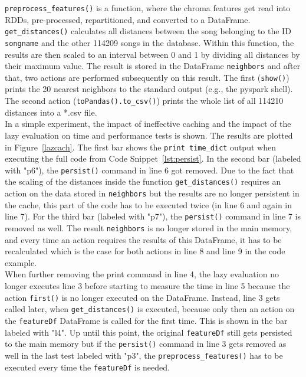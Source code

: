 \noindent \lstinline{preprocess_features()} is a function, where the chroma features get read into RDDs, pre-processed, repartitioned, and converted to a DataFrame. \lstinline{get_distances()} calculates all distances between the song belonging to the ID \lstinline{songname} and the other 114209 songs in the database. Within this function, the results are then scaled to an interval between 0 and 1 by dividing all distances by their maximum value. The result is stored in the DataFrame \lstinline{neighbors} and after that, two actions are performed subsequently on this result. The first (\lstinline{show()}) prints the 20 nearest neighbors to the standard output (e.g., the pyspark shell). The second action (\lstinline{toPandas().to_csv()}) prints the whole list of all 114210 distances into a *.csv file.\\
In a simple experiment, the impact of ineffective caching and the impact of the lazy evaluation on time and performance tests is shown. The results are plotted in Figure~\ref{lazcach}. The first bar shows the \lstinline{print time_dict} output when executing the full code from Code Snippet~\ref{lst:persist}. In the second bar (labeled with "p6"), the \lstinline{persist()} command in line 6 got removed. Due to the fact that the scaling of the distances inside the function \lstinline{get_distances()} requires an action on the data stored in \lstinline{neighbors} but the results are no longer persistent in the cache, this part of the code has to be executed twice (in line 6 and again in line 7). For the third bar (labeled with "p7"), the \lstinline{persist()} command in line 7 is removed as well. The result \lstinline{neighbors} is no longer stored in the main memory, and every time an action requires the results of this DataFrame, it has to be recalculated which is the case for both actions in line 8 and line 9 in the code example.\\
When further removing the print command in line 4, the lazy evaluation no longer executes line 3 before starting to measure the time in line 5 because the action \lstinline{first()} is no longer executed on the DataFrame. Instead, line 3 gets called later, when \lstinline{get_distances()} is executed, because only then an action on the \lstinline{featureDf} DataFrame is called for the first time. This is shown in the bar labeled with "l4". Up until this point, the original \lstinline{featureDf} still gets persisted to the main memory but if the \lstinline{persist()} command in line 3 gets removed as well in the last test labeled with "p3", the \lstinline{preprocess_features()} has to be executed every time the \lstinline{featureDf} is needed.  


